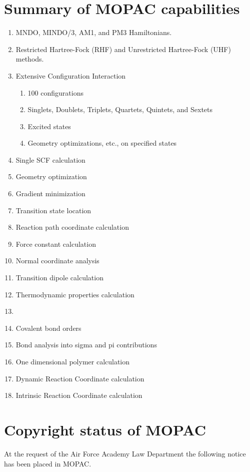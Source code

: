 \section{Summary of MOPAC capabilities}
\begin{enumerate}
\item MNDO, MINDO/3, AM1, and PM3 Hamiltonians.
\item Restricted  Hartree-Fock  (RHF)  and  Unrestricted  Hartree-Fock
      (UHF) methods.
\item Extensive Configuration Interaction
  \begin{enumerate}
     \item 100 configurations
     \item Singlets,  Doublets, Triplets, Quartets, Quintets, and Sextets
     \item Excited states
     \item Geometry optimizations, etc., on specified states
  \end{enumerate}
 \item Single SCF calculation
 \item Geometry optimization
 \item Gradient minimization
 \item Transition state location
 \item Reaction path coordinate calculation
 \item Force constant calculation
 \item Normal coordinate analysis
 \item Transition dipole calculation
 \item Thermodynamic properties calculation
 \item {}
 \item Covalent bond orders
 \item Bond analysis into sigma and pi contributions
 \item One dimensional polymer calculation
 \item Dynamic Reaction Coordinate calculation
 \item Intrinsic Reaction Coordinate calculation
\end{enumerate}

\section{Copyright status of MOPAC}
At the request of the Air Force Academy Law Department the following
notice has been placed in MOPAC.

